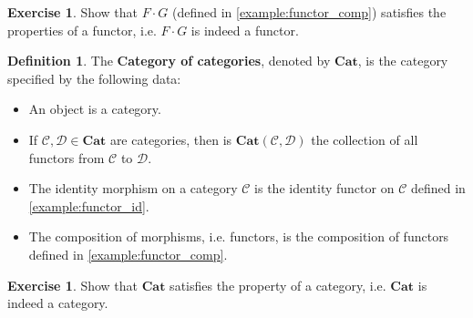 \documentclass[a4paper,10pt]{scrartcl}
\theoremstyle{plain}
\theoremstyle{definition}
\newtheorem{dfn}[thm]{Definition}
\newtheorem{exer}[thm]{Exercise}
\newcommand{\Cat}[1]{\mathcal{#1}}
\newcommand{\CC}{\Cat{C}}
\newcommand{\DD}{\Cat{D}}
\newcommand{\Catb}[1]{\mathbf{#1}}
\newcommand{\CAT}{\Catb{Cat}}
\newcommand{\CHom}[3]{{#1}(#2,#3)}
\newcommand{\Comp}{\cdot}
\begin{document}
\begin{exer} Show that $F\Comp G$ (defined in \cref{example:functor_comp}) satisfies the properties of a functor, i.e. $F\Comp G$ is indeed a functor.
\end{exer}

\begin{dfn} The \textbf{Category of categories}, denoted by $\CAT$, is the category specified by the following data:
\begin{itemize}
\item An object is a category.
\item If $\CC, \DD\in\CAT$ are categories, then is $\CHom \CAT \CC \DD$ the collection of all functors from $\CC$ to $\DD$.
\item The identity morphism on a category $\CC$ is the identity functor on $\CC$ defined in \cref{example:functor_id}.
\item The composition of morphisms, i.e. functors, is the composition of functors defined in \cref{example:functor_comp}.
\end{itemize} 
\end{dfn}

\begin{exer} Show that $\CAT$ satisfies the property of a category, i.e. $\CAT$ is indeed a category.
\end{exer}
\end{document}

